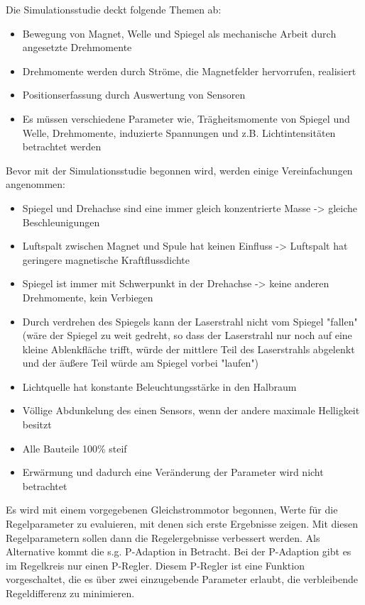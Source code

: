 Die Simulationsstudie deckt folgende Themen ab:
\begin{itemize}
\item Bewegung von Magnet, Welle und Spiegel als mechanische Arbeit durch angesetzte Drehmomente
\item Drehmomente werden durch Ströme, die Magnetfelder hervorrufen, realisiert
\item Positionserfassung durch Auswertung von Sensoren
\item Es müssen verschiedene Parameter wie, Trägheitsmomente von Spiegel und Welle, Drehmomente, induzierte Spannungen und z.B. Lichtintensitäten betrachtet werden
\end{itemize}

Bevor mit der Simulationsstudie begonnen wird, werden einige Vereinfachungen angenommen:
\begin{itemize}
\item Spiegel und Drehachse sind eine immer gleich konzentrierte Masse -> gleiche Beschleunigungen
\item Luftspalt zwischen Magnet und Spule hat keinen Einfluss -> Luftspalt hat geringere magnetische Kraftflussdichte
\item Spiegel ist immer mit Schwerpunkt in der Drehachse -> keine anderen Drehmomente, kein Verbiegen
\item Durch verdrehen des Spiegels kann der Laserstrahl nicht vom Spiegel "fallen" (wäre der Spiegel zu weit gedreht, so dass der Laserstrahl nur noch auf eine kleine Ablenkfläche 
trifft, würde der mittlere Teil des Laserstrahls abgelenkt und der äußere Teil würde am Spiegel vorbei "laufen")
\item Lichtquelle hat konstante Beleuchtungsstärke in den Halbraum
\item Völlige Abdunkelung des einen Sensors, wenn der andere maximale Helligkeit besitzt
\item Alle Bauteile 100\% steif
\item Erwärmung und dadurch eine Veränderung der Parameter wird nicht betrachtet
\end{itemize}

Es wird mit einem vorgegebenen Gleichstrommotor begonnen, Werte für die Regelparameter zu evaluieren, mit denen sich erste Ergebnisse zeigen.
Mit diesen Regelparametern sollen dann die Regelergebnisse verbessert werden.
Als Alternative kommt die s.g. P-Adaption in Betracht. 
Bei der P-Adaption gibt es im Regelkreis nur einen P-Regler. 
Diesem P-Regler ist eine Funktion vorgeschaltet, die es über zwei einzugebende Parameter erlaubt, die verbleibende Regeldifferenz zu minimieren.